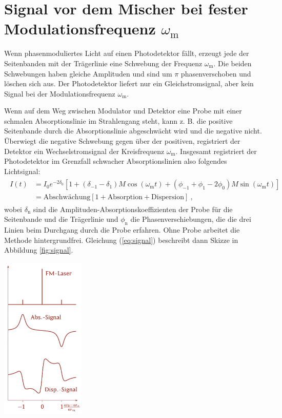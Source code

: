 
\section{Signal vor dem Mischer bei fester Modulationsfrequenz $\omega_\mathrm{m}$}
\label{sec:signalMischer}

Wenn phasenmoduliertes  Licht  auf  einen  Photodetektor fällt, erzeugt jede der Seitenbanden mit der Trägerlinie eine Schwebung der Frequenz $\omega_\mathrm{m}$. Die beiden Schwebungen haben gleiche Amplituden und sind um $\pi$ phasenverschoben und löschen sich aus. Der Photodetektor liefert nur ein Gleichstromsignal, aber kein Signal bei der Modulationsfrequenz $\omega_\mathrm{m}$. 

Wenn auf dem Weg zwischen Modulator und Detektor eine Probe mit einer schmalen Absorptionslinie im Strahlengang steht, kann z. B. die positive Seitenbande durch die Absorptionslinie abgeschwächt wird und die negative nicht. Überwiegt die negative Schwebung gegen über der positiven, registriert der Detektor ein Wechselstromsignal der Kreisfrequenz $\omega_\mathrm{m}$. Insgesamt registriert der Photodetektor im Grenzfall schwacher Absorptionslinien also folgendes Lichtsignal:
\begin{gather}
    \begin{aligned}
        I(t) &= I_0 e^{-2\delta_0}\left[ 1 + (\delta_{-1} - \delta_{1})M\cos(\omega_\mathrm{m}t) + (\phi_{-1} + \phi_{1} - 2\phi_0)M\sin(\omega_\mathrm{m}t) \right]\\
             &= \text{Abschw\"achung}\left[1 + \mathrm{Absorption} + \mathrm{Dispersion}\right]~,
    \end{aligned}
    \label{eq:signal}
\end{gather}
wobei $\delta_\mathrm{n}$ sind die Amplituden-Absorptionskoeffizienten der Probe für die Seitenbande und die Trägerlinie und $\phi_\mathrm{n}$ die Phasenverschiebungen, die die drei Linien beim Durchgang durch die Probe erfahren. Ohne Probe arbeitet die Methode hintergrundfrei. Gleichung (\ref{eq:signal}) beschreibt dann Skizze in Abbildung \ref{fig:signal}. \cite{anleitung}
\begin{center}
    \captionsetup{type=figure}
    \includegraphics[width=0.3\textwidth]{Bilder/Signal.png}
    \label{fig:signal}
\end{center}
